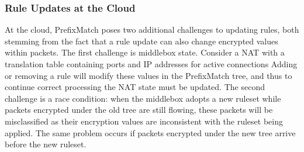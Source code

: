 

%
%
%




\subsubsection{Rule Updates at the Cloud}
\label{sec:updates}
At the cloud, PrefixMatch poses two additional challenges to updating rules, both stemming from the fact that a rule update can also change encrypted values within packets.
The first challenge is middlebox state. Consider a NAT with a translation table containing ports and IP addresses for active connections
Adding or removing a rule will modify these values in the PrefixMatch tree, and thus to continue correct processing the NAT state must be updated.
The second challenge is a race condition: when the middlebox adopts a new ruleset while packets encrypted under the old tree are still flowing, these packets will be misclassified as their encryption values are inconsistent with the ruleset being applied. 
The same problem occurs if packets encrypted under the new tree arrive before the new ruleset.

